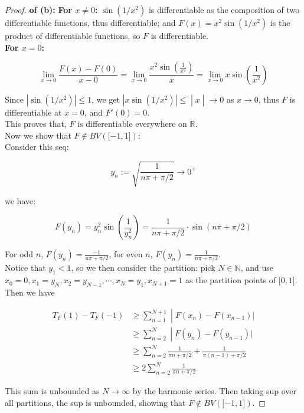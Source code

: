 \documentclass{qlnotes-export}
\begin{document}
\begin{proof}

\textbf{of (b):} \textbf{For \(x \neq 0\):} \(\sin(1/x^{2})\) is differentiable as the composition of two differentiable functions, thus differentiable; and \(F(x) = x^{2}\sin\left( {1/x^{2}} \right)\) is the product of differentiable functions, so \(F\) is differentiable.\\
\textbf{For \(x = 0\):}

\[\lim\limits_{x\rightarrow 0}\frac{F(x) - F(0)}{x - 0} = \lim\limits_{x\rightarrow 0}\frac{x^{2}\sin\left( \frac{1}{x^{2}} \right)}{x} = \lim\limits_{x\rightarrow 0}x\sin\left( \frac{1}{x^{2}} \right)\]

Since \(\left| {\sin\left( {1/x^{2}} \right)} \right| \leq 1\), we get \(\left. \left| {x\sin\left( {1/x^{2}} \right)} \right| \leq \middle| x \middle| \rightarrow 0 \right.\) as \(x\rightarrow 0\), thus \(F\) is differentiable at \(x = 0\), and \(F'(0) = 0\).\\
This proves that, \(F\) is differentiable everywhere on \(\mathbb{R}\).\\
Now we show that \(F \notin BV(\lbrack - 1,1\rbrack)\):\\
Consider this seq:

\[y_{n} := \sqrt{\frac{1}{n\pi + \pi/2}}\rightarrow 0^{+}\]

we have:

\[F\left( y_{n} \right) = y_{n}^{2}\sin\left( \frac{1}{y_{n}^{2}} \right) = \frac{1}{n\pi + \pi/2} \cdot \sin(n\pi + \pi/2)\]

For odd \(n\), \(F(y_{n}) = \frac{- 1}{n\pi + \pi/2}\), for even \(n\), \(F(y_{n}) = \frac{1}{n\pi + \pi/2}\).\\
Notice that \(y_{1} < 1\), so we then consider the partition: pick \(N \in {\mathbb{N}}\), and use \(x_{0} = 0,x_{1} = y_{N},x_{2} = y_{N - 1},\cdots,x_{N} = y_{1},x_{N + 1} = 1\) as the partition points of \(\lbrack 0,1\rbrack\).\\
Then we have

\[\begin{matrix}
{T_{F}(1) - T_{F}( - 1)} & \left. \geq \sum\limits_{n = 1}^{N + 1} \middle| F(x_{n}) - F(x_{n - 1})| \right. \\
 & \left. \geq \sum\limits_{n = 2}^{N} \middle| F(y_{n}) - F(y_{n - 1})| \right. \\
 & {\geq \sum\limits_{n = 2}^{N}\frac{1}{\pi n + \pi/2} + \frac{1}{\pi(n - 1) + \pi/2}} \\
 & {\geq 2\sum\limits_{n = 2}^{N}\frac{1}{\pi n + \pi/2}}
\end{matrix}\]

This sum is unbounded as \(N\rightarrow\infty\) by the harmonic series. Then taking sup over all partitions, the sup is unbounded, showing that \(F \notin BV(\lbrack - 1,1\rbrack)\).

\end{proof}
\end{document}
